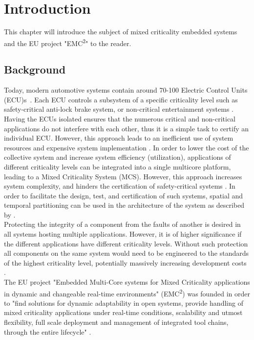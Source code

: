 \chapter{Introduction}
\label{sec:introduction}
This chapter will introduce the subject of mixed criticality embedded systems and the EU project "EMC\textsuperscript{2}" to the reader.

\section{Background}
Today, modern automotive systems contain around 70-100 Electric Control Units (ECU)s~\cite{thompson2012}. Each ECU controls a subsystem of a specific criticality level such as safety-critical anti-lock brake system, or non-critical entertainment systems \cite{weber2015}. Having the ECUs isolated ensures that the numerous critical and non-critical applications do not interfere with each other, thus it is a simple task to certify an individual ECU. However, this approach leads to an inefficient use of system resources and expensive system implementation \cite{burns2016}. In order to lower the cost of the collective system and increase system efficiency (utilization), applications of different criticality levels can be integrated into a single multicore platform, leading to a Mixed Criticality System (MCS). However, this approach increases system complexity, and hinders the certification of safety-critical systems \cite{zaki2016}. %
In order to facilitate the design, test, and certification of such systems, spatial and temporal partitioning can be used in the architecture of the system as described by \cite{zaki2016}.\\

Protecting the integrity of a component from the faults of another is desired in all systems hosting multiple applications. However, it is of higher significance if the different applications have different criticality levels. Without such protection all components on the same system would need to be engineered to the standards of the highest criticality level, potentially massively increasing development costs \cite{burns2016}.\\

The EU project "Embedded Multi-Core systems for Mixed Criticality applications in dynamic and changeable real-time environments" (EMC\textsuperscript{2}) was founded in order to "find solutions for dynamic adaptability in open systems, provide handling of mixed criticality applications under real-time conditions, scalability and utmost flexibility, full scale deployment and management of integrated tool chains, through the entire lifecycle" \cite{weber2015}. 

